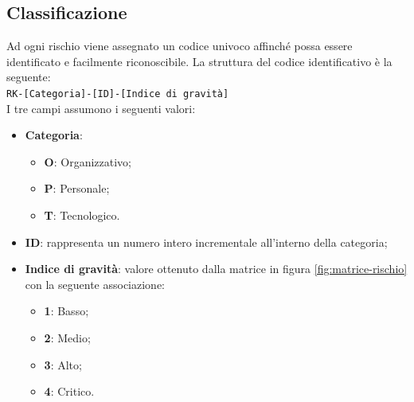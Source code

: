 \documentclass[../piano-di-progetto.tex]{subfiles}
\begin{document}
\subsection{Classificazione}
Ad ogni rischio viene assegnato un codice univoco affinché possa essere identificato e facilmente riconoscibile. La struttura del codice identificativo è la seguente: \\
\texttt{RK-[Categoria]-[ID]-[Indice di gravità]} \\
I tre campi assumono i seguenti valori:
\begin{itemize}
    \item \textbf{Categoria}:
        \begin{itemize}
            \item \textbf{O}: Organizzativo;
            \item \textbf{P}: Personale;
            \item \textbf{T}: Tecnologico.
        \end{itemize}
    \item \textbf{ID}: rappresenta un numero intero incrementale all'interno della categoria;
    \item \textbf{Indice di gravità}: valore ottenuto dalla matrice in figura \ref{fig:matrice-rischio} con la seguente associazione:
        \begin{itemize}
            \item \textbf{1}: Basso;
            \item \textbf{2}: Medio;
            \item \textbf{3}: Alto;
            \item \textbf{4}: Critico.
        \end{itemize}
\end{itemize}
\end{document}
